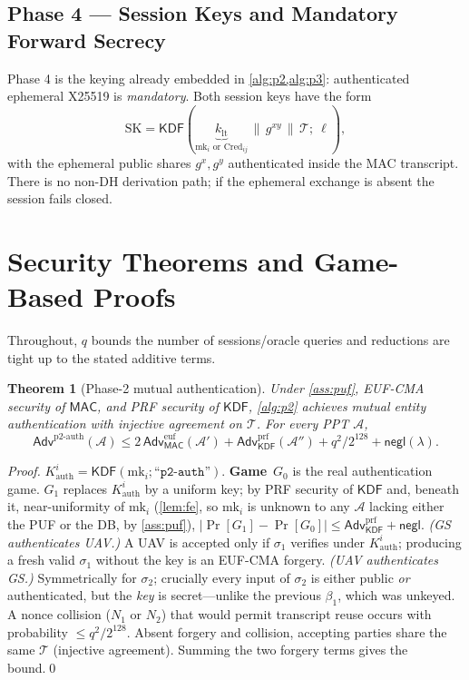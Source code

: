 \documentclass[11pt]{article}
\theoremstyle{plain}
\newtheorem{theorem}{Theorem}
\theoremstyle{definition}
\newcommand{\Cred}{\mathrm{Cred}}
\newcommand{\mk}{\mathrm{mk}}
\newcommand{\SK}{\mathrm{SK}}
\newcommand{\MAC}{\mathsf{MAC}}
\newcommand{\KDF}{\mathsf{KDF}}
\newcommand{\adv}{\mathcal{A}}
\newcommand{\secpar}{\lambda}
\newcommand{\negl}{\mathsf{negl}}
\newcommand{\Adv}{\mathsf{Adv}}
\newcommand{\lbl}[1]{\text{``}\texttt{#1}\text{''}}
\newcommand{\catt}{\,\|\,}          %
\newcommand{\transcript}{\mathcal{T}}
\begin{document}
\subsection{Phase 4 --- Session Keys and Mandatory Forward Secrecy}
\label{sec:p4}
Phase 4 is the keying already embedded in
\cref{alg:p2,alg:p3}: authenticated ephemeral X25519 is \emph{mandatory}.
Both session keys have the form
\begin{equation}
\SK=\KDF(\underbrace{k_{\text{lt}}}_{\mk_i\text{ or }\Cred_{ij}}\catt
   g^{xy}\catt \transcript;\ \ell),
\label{eq:sk}
\end{equation}
with the ephemeral public shares $g^{x},g^{y}$ authenticated inside the MAC
transcript. There is no non-DH derivation path; if the ephemeral exchange is
absent the session fails closed.

\section{Security Theorems and Game-Based Proofs}
\label{sec:proofs}
Throughout, $q$ bounds the number of sessions/oracle queries and reductions
are tight up to the stated additive terms.

\begin{theorem}[Phase-2 mutual authentication]\label{thm:p2}
Under \cref{ass:puf}, EUF-CMA security of $\MAC$, and PRF security of
$\KDF$, \cref{alg:p2} achieves mutual entity authentication with injective
agreement on $\transcript$. For every PPT $\adv$,
\[
\Adv^{\mathrm{p2\text{-}auth}}(\adv)\le
2\,\Adv^{\mathrm{euf}}_{\MAC}(\adv')+\Adv^{\mathrm{prf}}_{\KDF}(\adv'')
+q^2/2^{128}+\negl(\secpar).
\]
\end{theorem}
\begin{proof}
$K^{i}_{\mathrm{auth}}=\KDF(\mk_i;\lbl{p2-auth})$. \textbf{Game}~$G_0$ is the
real authentication game. \textbf{$G_1$} replaces $K^{i}_{\mathrm{auth}}$ by
a uniform key; by PRF security of $\KDF$ and, beneath it, near-uniformity of
$\mk_i$ (\cref{lem:fe}, so $\mk_i$ is unknown to any $\adv$ lacking either
the PUF or the DB, by \cref{ass:puf}), $|\Pr[G_1]-\Pr[G_0]|\le
\Adv^{\mathrm{prf}}_{\KDF}+\negl$. \emph{(GS authenticates UAV.)} A UAV is
accepted only if $\sigma_1$ verifies under $K^{i}_{\mathrm{auth}}$; producing
a fresh valid $\sigma_1$ without the key is an EUF-CMA forgery. \emph{(UAV
authenticates GS.)} Symmetrically for $\sigma_2$; crucially every input of
$\sigma_2$ is either public \emph{or} authenticated, but the \emph{key} is
secret---unlike the previous $\beta_1$, which was unkeyed. A nonce collision
($N_1$ or $N_2$) that would permit transcript reuse occurs with probability
$\le q^2/2^{128}$. Absent forgery and collision, accepting parties share the
same $\transcript$ (injective agreement). Summing the two forgery terms
gives the bound.\qed
\end{proof}
\end{document}
